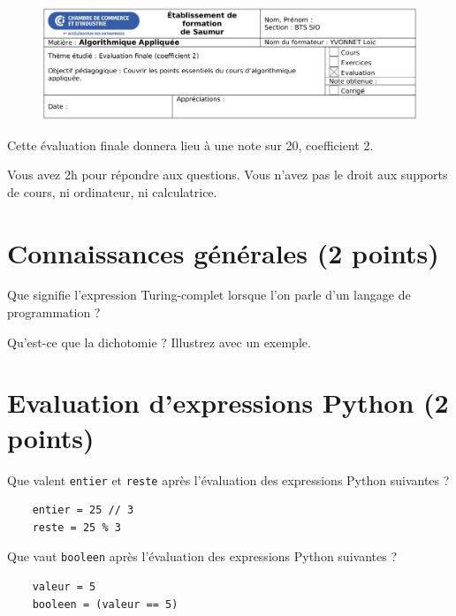 \documentclass{exam}
\begin{document}
\begin{figure}
    \centering
    \includegraphics[width=19cm]{assets/entete-cci.png}
\end{figure}

\begin{center}
    Cette évaluation finale donnera lieu à une note sur 20, coefficient 2.

    Vous avez 2h pour répondre aux questions. Vous n'avez pas le droit aux supports de cours, ni ordinateur, ni calculatrice.
\end{center}

\section{Connaissances générales \small{(2 points)}}
\begin{questions}
    \question Que signifie l'expression Turing-complet lorsque l'on parle d'un langage de programmation ?
    \vspace*{1cm}

    \question Qu'est-ce que la dichotomie ? Illustrez avec un exemple.
    \vspace*{3cm}
\end{questions}

\section{Evaluation d'expressions Python \small{(2 points)}}
\begin{questions}
    \question Que valent \texttt{entier} et \texttt{reste} après l'évaluation des expressions Python suivantes ?
    \begin{verbatim}
    entier = 25 // 3
    reste = 25 % 3
    \end{verbatim}
    \vspace*{1cm}

    \question Que vaut \texttt{booleen} après l'évaluation des expressions Python suivantes ?
    \begin{verbatim}
    valeur = 5
    booleen = (valeur == 5)
    \end{verbatim}
    \vspace*{3cm}
\end{questions}
\end{document}
